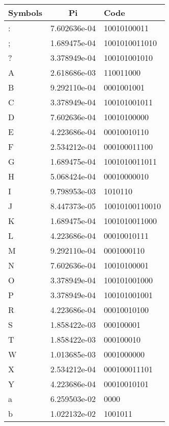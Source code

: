 \documentclass[12pt]{article} %
\numberwithin{equation}{section}
\begin{document}
\begin{table}[hptb]
\begin{minipage}{.5\linewidth}
\centering
\begin{tabular}{lcl}  %
\hline
Symbols  &Pi 				 &Code\\   \hline
: 		 &7.602636e-04 		 &10010100011\\
; 		 &1.689475e-04 		 &1001010011010\\
? 		 &3.378949e-04 		 &100101001010\\
A 		 &2.618686e-03 		 &110011000\\
B 		 &9.292110e-04 		 &0001001001\\
C 		 &3.378949e-04 		 &100101001011\\
D 		 &7.602636e-04 		 &10010100000\\
E 		 &4.223686e-04 		 &00010010110\\
F 		 &2.534212e-04 		 &000100011100\\
G 		 &1.689475e-04 		 &1001010011011\\
H 		 &5.068424e-04 		 &00010000010\\
I 		 &9.798953e-03 		 &1010110\\
J 		 &8.447373e-05 		 &10010100110010\\
K 		 &1.689475e-04 		 &1001010011000\\
L 		 &4.223686e-04 		 &00010010111\\
M 		 &9.292110e-04 		 &0001000110\\
N 		 &7.602636e-04 		 &10010100001\\
O 		 &3.378949e-04 		 &100101001000\\
P 		 &3.378949e-04 		 &100101001001\\
R 		 &4.223686e-04 		 &00010010100\\
S 		 &1.858422e-03 		 &000100001\\
T 		 &1.858422e-03 		 &000100010\\
W 		 &1.013685e-03 		 &0001000000\\
X 		 &2.534212e-04 		 &000100011101\\
Y 		 &4.223686e-04 		 &00010010101\\
a 		 &6.259503e-02 		 &0000\\
b 		 &1.022132e-02 		 &1001011\\ \hline
\end{tabular}
\end{minipage}\begin{minipage}{.5\linewidth}
\centering

\end{minipage}
\end{table}
\end{document}
